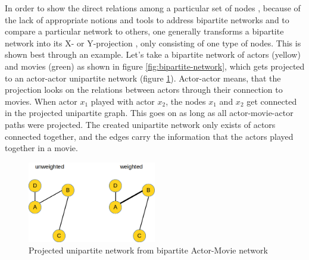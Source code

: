 \documentclass[
a4paper,     %
12pt         %
]{scrartcl}  %
\begin{document}
In order to show the direct relations among a particular set of nodes \citep{zhou_how_2007}, because of the lack of appropriate notions and tools to address bipartite networks and to compare a particular network to others, one generally transforms a bipartite network into its X- or Y-projection \citep{latapy_basic_2008}, only consisting of one type of nodes. This is shown best through an example. Let's take a bipartite network of actors (yellow) and movies (green) as shown in figure \ref{fig:bipartite-network}, which gets projected to an actor-actor unipartite network (figure \ref{fig:unipartite-network}). Actor-actor means, that the projection looks on the relations between actors through their connection to movies. When actor $x_{1}$ played with actor $x_{2}$, the nodes $x_{1}$ and $x_{2}$ get connected in the projected unipartite graph. This goes on as long as all actor-movie-actor paths were projected. The created unipartite network only exists of actors connected together, and the edges carry the information that the actors played together in a movie.

\begin{figure}[h!]
  \centering
  \includegraphics[width=0.5\textwidth]{./images/unipartite-actor-actor.png}
  \caption{Projected unipartite network from bipartite Actor-Movie network}
  \label{fig:unipartite-network}
\end{figure}
\end{document}
